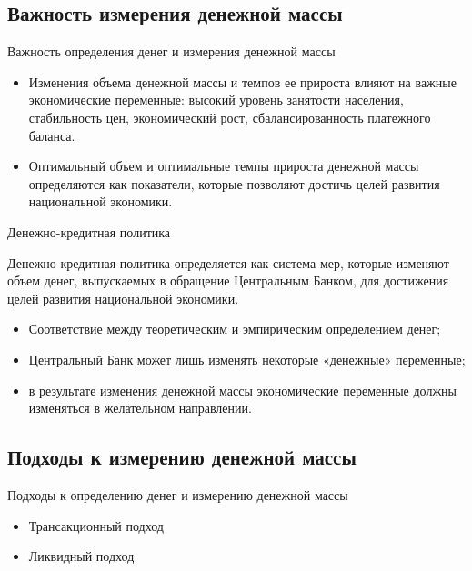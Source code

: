 \documentclass[_DKB_p1_Money.tex]{subfiles}
\begin{document}
\subsection{Важность измерения денежной массы}

\begin{frame}{Важность определения денег и измерения денежной массы}
\begin{itemize}[<+->]
\item
Изменения объема денежной массы и темпов ее прироста влияют на важные экономические переменные: высокий уровень занятости населения, стабильность цен, экономический рост, сбалансированность платежного баланса. 

\item
Оптимальный объем и оптимальные темпы прироста денежной массы определяются как показатели, которые позволяют достичь целей развития национальной экономики.
\end{itemize}
\end{frame}

\begin{frame}{Денежно-кредитная политика }
\begin{block}{Денежно-кредитная политика }
\quad
определяется как система мер, которые изменяют объем денег, выпускаемых в обращение Центральным Банком, для достижения целей развития национальной экономики.
\end{block}
\begin{itemize}[<+->]
\item
Соответствие между теоретическим и эмпирическим определением денег;

\item
Центральный Банк может лишь изменять некоторые «денежные» переменные;

\item
в результате изменения денежной массы экономические переменные должны изменяться в желательном направлении.
\end{itemize}
\end{frame}

\subsection{Подходы к измерению денежной массы}
\begin{frame}{Подходы к определению денег и измерению денежной массы}
\begin{itemize}
\item
Трансакционный подход

\item
Ликвидный подход

\end{itemize}
\end{frame}
\end{document}

